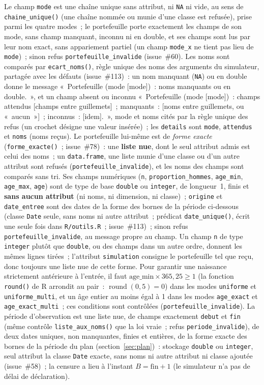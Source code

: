 \documentclass[a4paper,11pt]{article}
\newcommand{\code}[1]{\texttt{\small #1}}
\begin{document}
\noindent
Le champ \code{mode} est une chaîne unique sans attribut, ni \code{NA} ni
vide, au sens de \code{chaine\_unique()} (une chaîne nommée ou munie d'une
classe est refusée), prise parmi les quatre modes~; le
portefeuille porte exactement les champs de son mode, sans champ manquant,
inconnu ni en double, et ses champs sont lus par leur nom exact, sans
appariement partiel (un champ \code{mode\_x} ne tient pas lieu de
\code{mode})~; sinon refus \code{portefeuille\_invalide} (issue~\#60).
Les noms sont comparés par \code{ecart\_noms()}, règle unique des noms
des arguments du simulateur, partagée avec les défauts (issue~\#113)~:
un nom manquant (\code{NA}) ou en double donne le message «~Portefeuille
(mode [mode])~: noms manquants ou en double.~», et un champ absent ou
inconnu «~Portefeuille (mode [mode])~: champs attendus [champs entre
guillemets]~; manquants~: [noms entre guillemets, ou «~aucun~»]~;
inconnus~: [idem].~», mode et noms cités par la règle unique des refus
(un crochet désigne une valeur insérée)~; les \code{details} sont
\code{mode}, \code{attendus} et \code{noms} (noms reçus).
Le portefeuille lui-même est de \emph{forme exacte}
(\code{forme\_exacte()}~; issue~\#78)~: une \textbf{liste nue}, dont le seul
attribut admis est celui des noms~; un \code{data.frame}, une liste munie
d'une classe ou d'un autre attribut sont refusés
(\code{portefeuille\_invalide}), et les noms des champs sont comparés sans
tri. Ses champs numériques (\code{n}, \code{proportion\_hommes},
\code{age\_min}, \code{age\_max}, \code{age}) sont de type de base
\code{double} ou \code{integer}, de longueur~1, finis et \textbf{sans aucun
attribut} (ni noms, ni dimension, ni classe)~; \code{origine} et
\code{date\_entree} sont des dates de la forme des bornes de la période
ci-dessous (classe \code{Date} seule, sans noms ni autre attribut~;
prédicat \code{date\_unique()}, écrit une seule fois dans
\code{R/outils.R}~; issue~\#113)~; sinon
refus \code{portefeuille\_invalide}, au message propre au champ. Un champ
\code{n} de type \code{integer} plutôt que \code{double}, ou des champs
dans un autre ordre, donnent les mêmes lignes tirées~; l'attribut
\code{simulation} consigne le portefeuille tel que reçu, donc toujours une
liste nue de cette forme.
Pour garantir une naissance strictement antérieure à l'entrée, il faut
$\text{age\_min} \times 365{,}25 \ge 1$ (la fonction \code{round()} de R arrondit
au pair~: $\operatorname{round}(0{,}5) = 0$) dans les modes \code{uniforme} et
\code{uniforme\_multi}, et un âge entier au moins égal à 1 dans les modes
\code{age\_exact} et \code{age\_exact\_multi}~; ces conditions sont contrôlées
(\code{portefeuille\_invalide}). La période d'observation est une liste
nue, de champs exactement \code{debut} et \code{fin} (même contrôle
\code{liste\_aux\_noms()} que la loi vraie~; refus \code{periode\_invalide}),
de deux dates uniques, non manquantes, finies et entières, de la forme
exacte des bornes de la période du plan (section~\ref{sec:plan})~: stockage
\code{double} ou \code{integer}, seul attribut la classe \code{Date}
exacte, sans noms ni autre attribut ni classe ajoutée (issue~\#58)~; la censure a lieu à l'instant
$B = \text{fin} + 1$ (le simulateur n'a pas de délai de déclaration).
\end{document}
